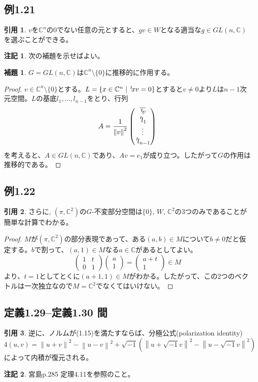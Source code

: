 \documentclass[12pt]{jsarticle}
\newcommand{\C}{\mathbb{C}}
\newcommand{\single}{\{ 0 \}}%
\newcommand{\I}{\sqrt{-1}}%
\newcommand{\norm}[1]{\left \lVert #1 \right \rVert}%
\newcommand{\transpose}[1]{\, {\vphantom{#1}}^t\!{#1}}%
\theoremstyle{definition}%
\newtheorem*{lemma}{補題}
\newtheorem*{note}{注記}
\newtheorem*{quo}{引用}%
\renewenvironment{leftbar}{%
  \renewcommand\FrameCommand{\vrule width 1pt \hspace{10pt}}%
  \MakeFramed {\advance\hsize-\width \FrameRestore}}%
 {\endMakeFramed}
\newcommand{\barquo}[1]{\begin{leftbar} \begin{quo}  #1 \end{quo} \end{leftbar}}
\newcommand{\bfsubsection}[1]{\subsection*{\textbf{#1}}}
\begin{document}
\bfsubsection{例1.21}
\barquo{
$v$を$\C^n$の0でない任意の元とすると、$gv \in W$となる適当な$g \in GL(n,\C)$を選ぶことができる。
}
\begin{note}
次の補題を示せばよい。
\end{note}
\begin{lemma}
    $G = GL(n,\C)$は$\C^n \setminus \single$に推移的に作用する。
\end{lemma}
\begin{proof}
  $v \in \C^n \setminus \single$とする。$L = \{ x \in \C^n \mid \transpose{x}v = 0\}$とすると$v \neq 0$より$L$は$n-1$次元空間。$L$の基底$l_1, \ldots , l_{n-1}$をとり、行列
  \[
  A=\frac{1}{\norm{v}^2} \begin{pmatrix}
   \overline{\transpose{v}} \\
   \transpose{l_1} \\
   \vdots \\
   \transpose{l_{n-1}} \\
\end{pmatrix}
  \]
を考えると、$A \in GL(n,\C)$であり、$Av=e_1$が成り立つ。したがって$G$の作用は推移的である。
\end{proof}

\bfsubsection{例1.22}
\barquo{
さらに, $(\pi,\C^2)$の$G$-不変部分空間は$\single$, $W$, $\C^2$の3つのみであることが簡単な計算でわかる。
}
\begin{proof}
  $M$が$(\pi,\C^2)$の部分表現であって、ある$(a,b) \in M$について$b \neq 0$だと仮定する。$b$で割って、$(a,1) \in M$なる$a \in \C$があるとしてよい。
  \[
  \begin{pmatrix}
    1 & t \\ 0 & 1
  \end{pmatrix}
  \begin{pmatrix}
    a \\ 1
  \end{pmatrix}
  = \begin{pmatrix}
  a + t \\ 1
\end{pmatrix}
\in M
  \]
より、$t = 1$としてとくに$(a+1,1) \in M$がわかる。したがって、この2つのベクトルは一次独立なので$M=\C^2$でなくてはいけない。
\end{proof}

\bfsubsection{定義1.29--定義1.30 間}
\barquo{
逆に、ノルムが(1.15)を満たすならば、分極公式(polarization identity)
\[
4(u,v)= \norm{u+v}^2 - \norm{u-v}^2 + \I(\norm{u+\I v}^2 - \norm{u - \I v}^2)
\]
によって内積が復元される。
}
\begin{note}
宮島\cite{宮島}p.285 定理4.11を参照のこと。
\end{note}
\end{document}
